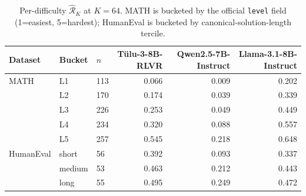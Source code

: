 \begin{table}[htbp]
\centering
\small
\setlength{\tabcolsep}{5pt}
\caption{Per-difficulty $\hat{\mathcal R}_K$ at $K{=}64$. MATH is bucketed by the official \texttt{level} field (1=easiest, 5=hardest); HumanEval is bucketed by canonical-solution-length tercile.}
\label{tab:appendix_per_difficulty}
\begin{tabular}{lll rrr}
\toprule
Dataset & Bucket & $n$ & Tülu-3-8B-RLVR & Qwen2.5-7B-Instruct & Llama-3.1-8B-Instruct \\
\midrule
MATH & L1 & 113 & 0.066 & 0.009 & 0.202 \\
 & L2 & 170 & 0.174 & 0.039 & 0.339 \\
 & L3 & 226 & 0.253 & 0.049 & 0.449 \\
 & L4 & 234 & 0.320 & 0.088 & 0.557 \\
 & L5 & 257 & 0.545 & 0.218 & 0.648 \\
\midrule
HumanEval & short & 56 & 0.392 & 0.093 & 0.337 \\
 & medium & 53 & 0.463 & 0.212 & 0.443 \\
 & long & 55 & 0.495 & 0.249 & 0.472 \\
\bottomrule
\end{tabular}
\end{table}